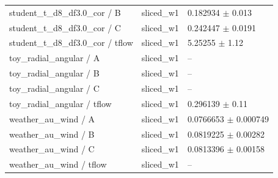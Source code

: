 \begin{tabular}{lll}
student\_t\_d8\_df3.0\_cor / B & sliced\_w1 & 0.182934 $\pm$ 0.013 \\
student\_t\_d8\_df3.0\_cor / C & sliced\_w1 & 0.242447 $\pm$ 0.0191 \\
student\_t\_d8\_df3.0\_cor / tflow & sliced\_w1 & 5.25255 $\pm$ 1.12 \\
toy\_radial\_angular / A & sliced\_w1 & -- \\
toy\_radial\_angular / B & sliced\_w1 & -- \\
toy\_radial\_angular / C & sliced\_w1 & -- \\
toy\_radial\_angular / tflow & sliced\_w1 & 0.296139 $\pm$ 0.11 \\
weather\_au\_wind / A & sliced\_w1 & 0.0766653 $\pm$ 0.000749 \\
weather\_au\_wind / B & sliced\_w1 & 0.0819225 $\pm$ 0.00282 \\
weather\_au\_wind / C & sliced\_w1 & 0.0813396 $\pm$ 0.00158 \\
weather\_au\_wind / tflow & sliced\_w1 & -- \\
\bottomrule
\end{tabular}
